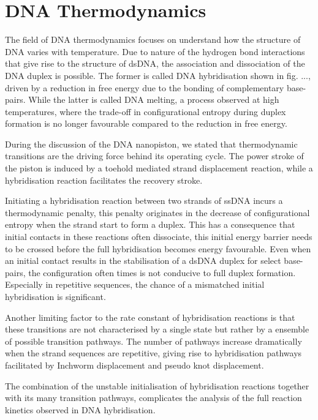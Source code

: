 \section{DNA Thermodynamics}
 The field of DNA thermodynamics focuses on understand how the structure of DNA varies
with temperature. Due to nature of the hydrogen bond interactions that give rise to the
structure of dsDNA, the association and dissociation of the DNA duplex is possible. The
former is called DNA hybridisation shown in fig. ..., driven by a reduction in free
energy due to the bonding of complementary base-pairs. While the latter is called DNA
melting, a process observed at high temperatures, where the trade-off in configurational
entropy during duplex formation is no longer favourable compared to the reduction in free
energy.

During the discussion of the DNA nanopiston, we stated that thermodynamic transitions are
the driving force behind its operating cycle. The power stroke of the piston is induced
by a toehold mediated strand displacement reaction, while a hybridisation reaction
facilitates the recovery stroke.

Initiating a hybridisation reaction between two strands of ssDNA incurs a thermodynamic
penalty, this penalty originates in the decrease of configurational entropy when the
strand start to form a duplex. This has a consequence that initial contacts in these
reactions often dissociate, this initial energy barrier needs to be crossed before the
full hybridisation becomes energy favourable. Even when an initial contact results in the
stabilisation of a dsDNA duplex for select base-pairs, the configuration often times is
not conducive to full duplex formation. Especially in repetitive sequences, the chance
of a mismatched initial hybridisation is significant.

Another limiting factor to the rate constant of hybridisation reactions is that these
transitions are not characterised by a single state but rather by a ensemble of possible
transition pathways. The number of pathways increase dramatically when the strand
sequences are repetitive, giving rise to hybridisation pathways facilitated by  Inchworm
displacement and pseudo knot displacement.

The combination of the unstable initialisation of hybridisation reactions together
with its many transition pathways, complicates the analysis of the full reaction kinetics
observed in DNA hybridisation.

